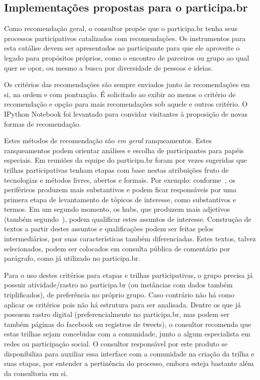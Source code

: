 \documentclass[12pt]{article}
\begin{document}
\subsection{Implementações propostas para o participa.br}

Como recomendação geral, o consultor propõe que o participa.br tenha seus processos participativos catalizados com recomendações. Os instrumentos para
esta catálise devem ser apresentados ao participante para que ele aproveite o legado para propósitos próprios, como o encontro de parceiros ou grupo ao qual quer se opor, ou mesmo a busca por diversidade de pessoas e ideias.

Os critérios das recomendações são sempre enviados junto às recomendações em si, na ordem e com pontuação. É solicitado ao exibir ao menos o critério de recomendação e opção para mais recomendações sob aquele e outros critério. O IPython Notebook foi levantado para convidar visitantes à proposição de novas formas de recomendação.

Estes métodos de recomendação são \emph{em geral} ranqueamentos. Estes ranqueamentos podem orientar análises e escolha de participantes para papéis especiais. Em reuniões da equipe do participa.br foram por vezes sugeridas que trilhas participativas tenham etapas com base nestas atribuições fruto de tecnologias e métodos livres, abertos e formais. Por exemplo: conforme~\cite{fabbri2}, os periféricos produzem mais substantivos e podem ficar responsáveis por uma primera etapa de levantamento de tópicos de interesse, como substantivos e termos. Em um segundo momento, os hubs, que produzem mais adjetivos (também segundo~\cite{fabbri2}), podem qualificar estes assuntos de interesse. Construção de textos a partir destes assuntos e qualificações podem ser feitas pelos intermediários, por suas características também diferenciadas. Estes textos, talvez selecionados, podem ser colocados em consulta pública de comentário por parágrafo, como já utilizado no participa.br.

Para o uso destes critérios para etapas e trilhas participativas, o grupo precisa já possuir atividade/rastro no participa.br (ou instâncias com dados também triplificados), de preferência no próprio grupo. Caso contrário não há como aplicar os critérios pois não há estrutura para ser analisada. Dentre os que já possuem rastro digital (preferencialmente no participa.br, mas podem ser também páginas do facebook ou registros de tweets), o consultor recomenda que estas trilhas sejam concebidas com a comunidade, junto a algum especialista em redes ou participação social. O consultor responsável por este produto se disponibiliza para auxiliar essa interface com a comunidade na criação da trilha e suas etapas, por entender a pertinência do processo, embora esteja bastante além da consultoria em si.
\end{document}
